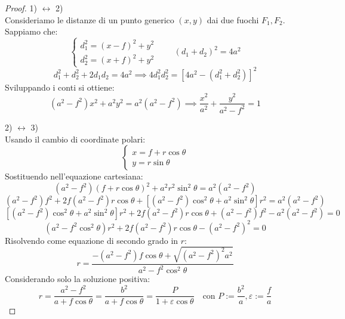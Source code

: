 \begin{proof}
    1) $\leftrightarrow$ 2)\\
    Consideriamo le distanze di un punto generico $(x, y)$ dai due fuochi $F_1, F_2$. Sappiamo che:
    \begin{equation}
        \begin{cases}
            d_1^2 = (x - f)^2 + y^2 \\
            d_2^2 = (x + f)^2 + y^2
        \end{cases}
        \qquad
        (d_1 + d_2)^2 = 4a^2
    \end{equation}
    \begin{equation}
        d_1^2 + d_2^2 + 2 d_1 d_2 = 4a^2 \implies 4 d_1^2 d_2^2 = \left[ 4a^2 - (d_1^2 + d_2^2) \right]^2
    \end{equation}
    Sviluppando i conti si ottiene:
    \begin{equation}
        (a^2 - f^2)x^2 + a^2 y^2 = a^2(a^2 - f^2) \implies \frac{x^2}{a^2} + \frac{y^2}{a^2 - f^2} = 1
    \end{equation}

    2) $\leftrightarrow$ 3)\\
    Usando il cambio di coordinate polari:
    \begin{equation}
        \begin{cases}
            x = f + r \cos\theta \\
            y = r \sin\theta
        \end{cases}
    \end{equation}
    Sostituendo nell'equazione cartesiana:
    \begin{equation*}
        (a^2 - f^2)(f + r\cos\theta)^2 + a^2 r^2 \sin^2\theta = a^2(a^2 - f^2)
    \end{equation*}
    \begin{equation*}
        (a^2 - f^2)f^2 + 2f(a^2 - f^2)r\cos\theta + \left[(a^2 - f^2)\cos^2\theta + a^2\sin^2\theta\right] r^2 = a^2(a^2 - f^2)
    \end{equation*}
    \begin{equation*}
        \left[(a^2 - f^2)\cos^2\theta + a^2\sin^2\theta\right] r^2 + 2f(a^2 - f^2) r\cos\theta + (a^2 - f^2)f^2 - a^2(a^2 - f^2) = 0
    \end{equation*}
    \begin{equation}
        \left(a^2 - f^2\cos^2\theta\right) r^2 + 2f(a^2 - f^2) r\cos\theta - (a^2 - f^2)^2 = 0
    \end{equation}
    Risolvendo come equazione di secondo grado in $r$:
    \begin{equation*}
        r = \frac{-(a^2 - f^2)f\cos\theta + \sqrt{(a^2 - f^2)^2 a^2}}{a^2 - f^2\cos^2\theta}
    \end{equation*}
    Considerando solo la soluzione positiva:
    \begin{equation}
        r = \frac{a^2 - f^2}{a + f\cos\theta}=\frac{b^2}{a + f\cos\theta}
        = \frac{P}{1 + \varepsilon\cos\theta} \quad \text{con } P:= \frac{b^2}{a}, \varepsilon:= \frac{f}{a}
    \end{equation}
\end{proof}
